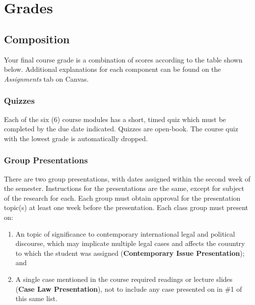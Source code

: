 \documentclass[10pt,]{article}
\providecommand{\tightlist}{%
  \setlength{\itemsep}{0pt}\setlength{\parskip}{0pt}}
\begin{document}
\hypertarget{grades}{%
\section{Grades}\label{grades}}

\hypertarget{composition}{%
\subsection{Composition}\label{composition}}

Your final course grade is a combination of scores according to the
table shown below. Additional explanations for each component can be
found on the \emph{Assignments} tab on Canvas.

\hypertarget{quizzes}{%
\subsubsection{Quizzes}\label{quizzes}}

Each of the six (6) course modules has a short, timed quiz which must be
completed by the due date indicated. Quizzes are open-book. The course
quiz with the lowest grade is automatically dropped.

\hypertarget{group-presentations}{%
\subsubsection{Group Presentations}\label{group-presentations}}

There are two group presentations, with dates assigned within the second
week of the semester. Instructions for the presentations are the same,
except for subject of the research for each. Each group must obtain
approval for the presentation topic(s) at least one week before the
presentation. Each class group must present on:

\begin{enumerate}
\def\labelenumi{\arabic{enumi}.}
\tightlist
\item
  An topic of significance to contemporary international legal and
  political discourse, which may implicate multiple legal cases and
  affects the couuntry to which the student was assigned
  (\textbf{Contemporary Issue Presentation}); and
\item
  A single case mentioned in the course required readings or lecture
  slides (\textbf{Case Law Presentation}), not to include any case
  presented on in \#1 of this same list.
\end{enumerate}
\end{document}
